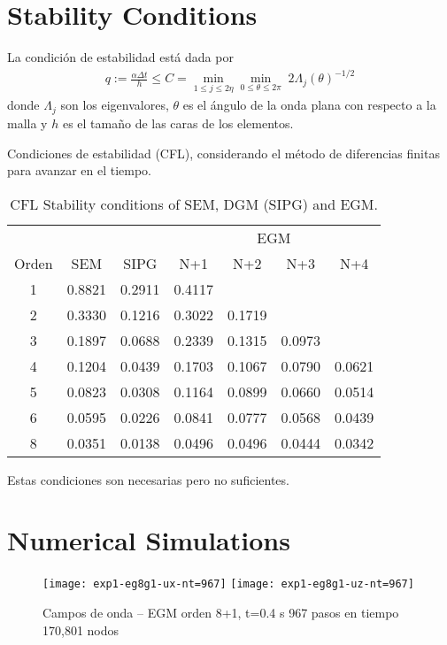 \documentclass[review,hidelinks,onefignum,onetabnum]{siamart220329}
\newcommand{\tw}{\textwidth}
\begin{document}
\section{Stability Conditions}

La condici\'on de estabilidad est\'a dada por
\begin{eqnarray*}
	q:=\frac{\alpha\Delta t}{h} \le C =
	\min_{1\le j\le 2\eta} 
	\min_{0\le\theta\le 2\pi}\; 2\Lambda_j(\theta)^{-1/2}
\end{eqnarray*}
donde $\Lambda_j$ son los eigenvalores, $\theta$ es el \'angulo de la onda plana con respecto a la malla y $h$ es el tama\~no de las caras de los elementos.

Condiciones de estabilidad (CFL), considerando el m\'etodo de diferencias finitas para avanzar en el tiempo.

\begin{table}
 
\caption{CFL Stability conditions of SEM, DGM (SIPG) and EGM.}

\begin{tabular}{|c | c  c | c  c  c  c |}
\hline
& & & \multicolumn{4}{c|}{EGM} 
\\
Orden & SEM & SIPG & N+1 & N+2 & N+3 & N+4 
\\
\hline
1 &	0.8821 &	0.2911 & 0.4117 & & &
\\
2 &	0.3330 &	0.1216 & 0.3022 &	0.1719 & &
\\
3 &	0.1897 &	0.0688 & 0.2339 &	0.1315 &	0.0973 &
\\
4 &	0.1204 &	0.0439 & 0.1703 &	0.1067 &	0.0790 &	0.0621
\\
5 &	0.0823 &	0.0308 & 0.1164 &	0.0899 &	0.0660 &	0.0514
\\
6 &	0.0595 &	0.0226 & 0.0841 &	0.0777 &	0.0568 &	0.0439
\\
8 &	0.0351 &	0.0138 & 0.0496 &	0.0496 &	0.0444 &	0.0342
\\
\hline
\end{tabular} 
\end{table} 
 
Estas condiciones son {necesarias pero no suficientes.}

\section{Numerical Simulations}

\begin{figure}
\texttt{[image: exp1-eg8g1-ux-nt=967]}
\texttt{[image: exp1-eg8g1-uz-nt=967]}
\caption{Campos de onda -- EGM orden 8+1, t=0.4 s \textbullet{} 967 pasos en tiempo \textbullet{} 170,801 nodos}
\end{figure} 
\end{document}
